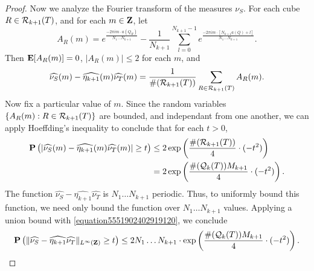 \begin{proof}
    Now we analyze the Fourier transform of the measures $\nu_S$. For each cube $R \in \operatorname{\mathcal{R}}_{k+1}(T)$, and for each $m \in \operatorname{\mathbf{Z}}$, let
    \[ A_R(m) = e^{\frac{-2 \pi i m \cdot a(Q_R)}{N_1 \dots N_{k+1}}} - \frac{1}{N_{k+1}} \sum_{l = 0}^{N_{k+1} - 1} e^{\frac{-2 \pi i m \cdot [N_{k+1} a(Q) + l]}{N_1 \dots N_{k+1}}}. \]
    Then $\operatorname{\mathbf{E}}[A_R(m)] = 0$, $|A_R(m)| \leq 2$ for each $m$, and
    \[ \widehat{\nu_S}(m) - \widehat{\eta_{k+1}}(m) \widehat{\nu_T}(m) = \frac{1}{\#(\operatorname{\mathcal{R}}_{k+1}(T))} \sum_{R \in \operatorname{\mathcal{R}}_{k+1}(T)} A_R(m). \]
    Now fix a particular value of $m$. Since the random variables $\{ A_R(m) : R \in \operatorname{\mathcal{R}}_{k+1}(T) \}$ are bounded, and independant from one another, we can apply Hoeffding's inequality to conclude that for each $t > 0$,
    \begin{equation} \label{equation5551902402919120}
    \begin{split}
        \operatorname{\mathbf{P}} \left( |\widehat{\nu_S}(m) - \widehat{\eta_{k+1}}(m) \widehat{\nu_T}(m)| \geq t \right) &\leq 2 \exp \left( \frac{\#(\operatorname{\mathcal{R}}_{k+1}(T))}{4} \cdot (-t^2) \right)\\
        &= 2 \exp \left( \frac{\#(\operatorname{\mathcal{Q}}_k(T)) M_{k+1}}{4} \cdot (-t^2) \right).
    \end{split}
    \end{equation}
    The function $\widehat{\nu_S} - \widehat{\eta_{k+1}} \widehat{\nu_T}$ is $N_1 \dots N_{k+1}$ periodic. Thus, to uniformly bound this function, we need only bound the function over $N_1 \dots N_{k+1}$ values. Applying a union bound with \eqref{equation5551902402919120}, we conclude
    \[ \operatorname{\mathbf{P}} \left( \| \widehat{\nu_S} - \widehat{\eta_{k+1}} \widehat{\nu_T} \|_{L^\infty(\operatorname{\mathbf{Z}})} \geq t \right) \leq 2N_1 \dots N_{k+1} \cdot \exp \left( \frac{\#(\operatorname{\mathcal{Q}}_k(T)) M_{k+1}}{4} \cdot (-t^2) \right). \]


\end{proof}
